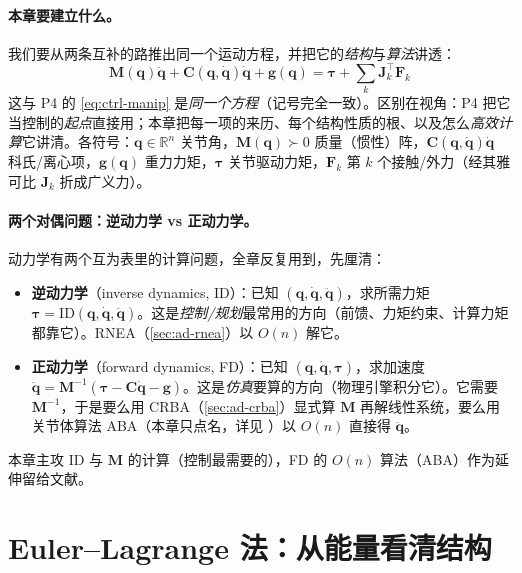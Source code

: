 \paragraph{本章要建立什么。}
我们要从两条互补的路推出同一个运动方程，并把它的\emph{结构}与\emph{算法}讲透：
\begin{equation}
  \boxed{\;\mathbf{M}(\mathbf{q})\ddot{\mathbf{q}}+\mathbf{C}(\mathbf{q},\dot{\mathbf{q}})\dot{\mathbf{q}}+\mathbf{g}(\mathbf{q})=\boldsymbol{\tau}+\textstyle\sum_k\mathbf{J}_k^\top\mathbf{F}_k\;}
  \label{eq:ad-manip}
\end{equation}
这与 P4 的 \cref{eq:ctrl-manip} 是\emph{同一个方程}（记号完全一致）。区别在视角：P4 把它当控制的\emph{起点}直接用；本章把每一项的来历、每个结构性质的根、以及怎么\emph{高效计算}它讲清。各符号：$\mathbf{q}\in\mathbb{R}^n$ 关节角，$\mathbf{M}(\mathbf{q})\succ0$ 质量（惯性）阵，$\mathbf{C}(\mathbf{q},\dot{\mathbf{q}})\dot{\mathbf{q}}$ 科氏/离心项，$\mathbf{g}(\mathbf{q})$ 重力力矩，$\boldsymbol{\tau}$ 关节驱动力矩，$\mathbf{F}_k$ 第 $k$ 个接触/外力（经其雅可比 $\mathbf{J}_k$ 折成广义力）。

\paragraph{两个对偶问题：逆动力学 vs 正动力学。}
动力学有两个互为表里的计算问题，全章反复用到，先厘清：
\begin{itemize}
  \item \textbf{逆动力学}（inverse dynamics, ID）：已知 $(\mathbf{q},\dot{\mathbf{q}},\ddot{\mathbf{q}})$，求所需力矩 $\boldsymbol{\tau}=\mathrm{ID}(\mathbf{q},\dot{\mathbf{q}},\ddot{\mathbf{q}})$。这是\emph{控制/规划}最常用的方向（前馈、力矩约束、计算力矩都靠它）。RNEA（\cref{sec:ad-rnea}）以 $O(n)$ 解它。
  \item \textbf{正动力学}（forward dynamics, FD）：已知 $(\mathbf{q},\dot{\mathbf{q}},\boldsymbol{\tau})$，求加速度 $\ddot{\mathbf{q}}=\mathbf{M}^{-1}(\boldsymbol{\tau}-\mathbf{C}\dot{\mathbf{q}}-\mathbf{g})$。这是\emph{仿真}要算的方向（物理引擎积分它）。它需要 $\mathbf{M}^{-1}$，于是要么用 CRBA（\cref{sec:ad-crba}）显式算 $\mathbf{M}$ 再解线性系统，要么用关节体算法 ABA（本章只点名，详见 \cite{featherstone2008rbda}）以 $O(n)$ 直接得 $\ddot{\mathbf{q}}$。
\end{itemize}
本章主攻 ID 与 $\mathbf{M}$ 的计算（控制最需要的），FD 的 $O(n)$ 算法（ABA）作为延伸留给文献。

\section{Euler--Lagrange 法：从能量看清结构}
\label{sec:ad-lagrange}

